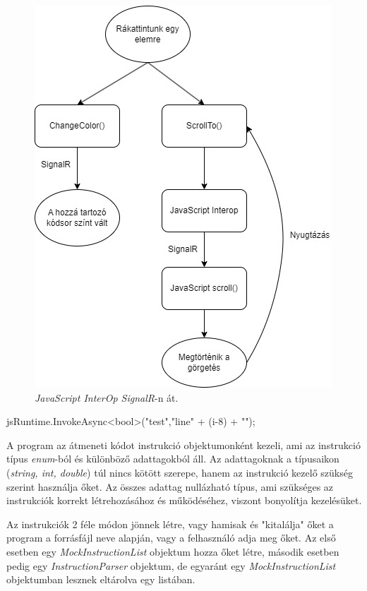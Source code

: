\begin{figure}[h]
\centering
\includegraphics[scale=0.5]{images/JSpl.jpg}
\caption{\textit{JavaScript InterOp SignalR}-n át.}
\label{fig:jspl}
\end{figure}

\begin{cpp}
jsRuntime.InvokeAsync<bool>("test","line{" + (i-8) + "}");
\end{cpp}

A program az átmeneti kódot instrukció objektumonként kezeli, ami az instrukció típus \textit{enum}-ból és különböző adattagokból áll. Az adattagoknak a típusaikon (\textit{string, int, double}) túl nincs kötött szerepe, hanem az instrukció kezelő szükség szerint használja őket. Az összes adattag nullázható típus, ami szükséges az instrukciók korrekt létrehozásához és működéséhez, viszont bonyolítja kezelésüket.

Az instrukciók 2 féle módon jönnek létre, vagy hamisak és "kitalálja" őket a program a forrásfájl neve alapján, vagy a felhasználó adja meg őket. Az első esetben egy \textit{MockInstructionList} objektum hozza őket létre, második esetben pedig egy \textit{InstructionParser} objektum, de egyaránt egy \textit{MockInstructionList} objektumban lesznek eltárolva egy listában.

